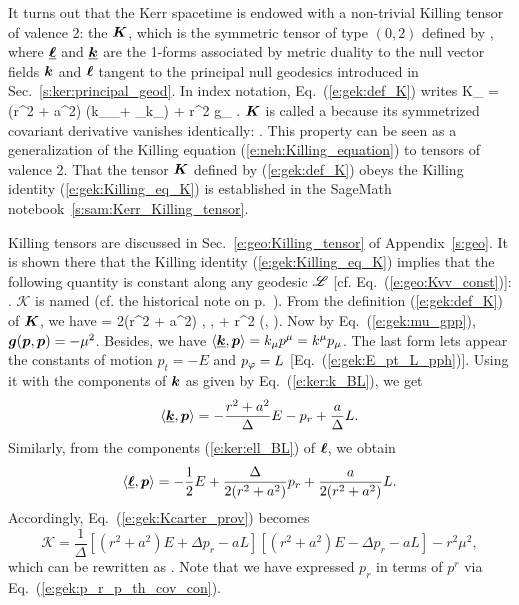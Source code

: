 It turns out that the Kerr spacetime is endowed with a non-trivial
Killing tensor of valence 2: the
 $\bm{K}$, which is the symmetric tensor of type
$(0,2)$ defined by
\be \label{e:gek:def_K}
     ,
\ee
where $\underline{\bm{\ell}}$ and $\underline{\bm{k}}$ are the 1-forms associated by metric duality
to the null vector fields $\bm{k}$ and $\bm{\ell}$ tangent to the principal null
geodesics introduced in Sec.~\ref{s:ker:principal_geod}. In index notation,
Eq.~(\ref{e:gek:def_K}) writes
\be
    K_{\alpha\beta} = (r^2 + a^2) \left(k_\alpha \el_\beta + \el_\alpha k_\beta \right)
        + r^2 g_{\alpha\beta} .
\ee
$\bm{K}$ is called a  because its symmetrized covariant derivative vanishes identically:
\be \label{e:gek:Killing_eq_K}
    .
\ee
This property can be seen as a generalization of the Killing equation
(\ref{e:neh:Killing_equation}) to tensors of valence 2.
That the tensor $\bm{K}$ defined by (\ref{e:gek:def_K}) obeys the Killing
identity (\ref{e:gek:Killing_eq_K}) is established in the
SageMath notebook~\ref{s:sam:Kerr_Killing_tensor}.

Killing tensors are discussed in Sec.~\ref{e:geo:Killing_tensor} of Appendix~\ref{s:geo}.
It is shown there that the Killing identity (\ref{e:gek:Killing_eq_K}) implies that
the following quantity is constant along any geodesic $\mathscr{L}$ [cf. Eq.~(\ref{e:geo:Kvv_const})]:
\be
     .
\ee
$\mathscr{K}$ is named 
(cf. the historical note on p.~\pageref{h:gek:eom_Carter}).
From the definition (\ref{e:gek:def_K}) of $\bm{K}$, we have
\be \label{e:gek:Kcarter_prov}
     = 2(r^2 + a^2) \langle {},  \rangle
        \langle \uu{\el},  \rangle + r^2 (, ).
\ee
Now by Eq.~(\ref{e:gek:mu_gpp}), $\bm{g}(\bm{p}, \bm{p}) = - \mu^2$. Besides, we
have $\langle \underline{\bm{k}}, \bm{p} \rangle = k_\mu p^\mu = k^\mu p_\mu$.
The last form lets appear the constants of motion $p_t = -E$ and
$p_\varphi = L$ [Eq.~(\ref{e:gek:E_pt_L_pph})]. Using it with the components
of $\bm{k}$ as given by Eq.~(\ref{e:ker:k_BL}), we get
\[
    \langle \underline{\bm{k}}, \bm{p} \rangle = - \frac{r^2 + a^2}{\Delta} E
    - p_r + \frac{a}{\Delta} L .
\]
Similarly, from the components (\ref{e:ker:ell_BL}) of $\bm{\ell}$, we obtain
\[
     \langle \underline{\bm{\ell}}, \bm{p} \rangle = - \frac{1}{2} E + \frac{\Delta}{2(r^2 + a^2)} p_r
     + \frac{a}{2(r^2 + a^2)} L .
\]
Accordingly, Eq.~(\ref{e:gek:Kcarter_prov}) becomes
\[
    \mathscr{K} = \frac{1}{\Delta} \left[ (r^2 + a^2) E + \Delta p_r - a L \right]
      \left[ (r^2 + a^2) E - \Delta p_r - a L \right] - r^2 \mu^2 ,
\]
which can be rewritten as
\be \label{e:gek:Kcarter_first_int}
   .
\ee
Note that we have expressed $p_r$ in terms of $p^r$ via Eq.~(\ref{e:gek:p_r_p_th_cov_con}).

